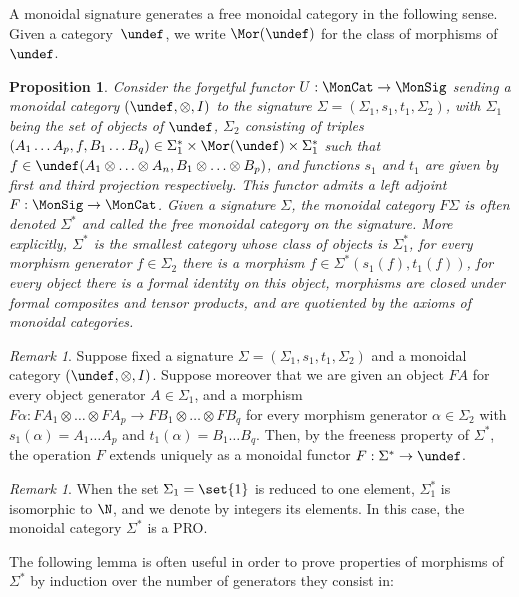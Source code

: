\documentclass[submission,copyright,creativecommons]{eptcs}
\let\C\undef
\newtheorem{proposition}[theorem]{Proposition}
\theoremstyle{definition}
\theoremstyle{remark}
\newtheorem{remark}[theorem]{Remark}
\begin{document}
A monoidal signature generates a free monoidal category in the following
sense. Given a category~$\C$, we write $\Mor(\C)$ for the class of morphisms
of~$\C$.

\begin{proposition}
  Consider the forgetful functor $U:\MonCat\to\MonSig$ sending a monoidal
  category $(\C,\otimes,I)$ to the signature
  $\Sigma=(\Sigma_1,s_1,t_1,\Sigma_2)$, with $\Sigma_1$ being the set of objects
  of $\C$, $\Sigma_2$ consisting of triples $(A_1\ldots A_p,f,B_1\ldots
  B_q)\in\Sigma_1^*\times\Mor(\C)\times\Sigma_1^*$ such that
  $f\in\C(A_1\otimes\ldots\otimes A_n,B_1\otimes\ldots\otimes B_p)$, and
  functions $s_1$ and $t_1$ are given by first and third projection
  respectively. This functor admits a left adjoint $F:\MonSig\to\MonCat$. Given
  a signature $\Sigma$, the monoidal category $F\Sigma$ is often denoted
  $\Sigma^*$ and called the \emph{free monoidal category} on the signature.
More explicitly, $\Sigma^*$ is the smallest category whose class of objects is
  $\Sigma_1^*$, for every morphism generator $f\in\Sigma_2$ there is a morphism
  $f\in\Sigma^*(s_1(f),t_1(f))$, for every object there is a formal identity on
  this object, morphisms are closed under formal composites and tensor products,
  and are quotiented by the axioms of monoidal categories.
\end{proposition}

\begin{remark}
  \label{rem:free-moncat}
  Suppose fixed a signature $\Sigma=(\Sigma_1,s_1,t_1,\Sigma_2)$ and a monoidal
  category $(\C,\otimes,I)$. Suppose moreover that we are given an object $FA$
  for every object generator $A\in\Sigma_1$, and a morphism
  $F\alpha:FA_1\otimes\ldots\otimes FA_p\to FB_1\otimes\ldots\otimes FB_q$ for
  every morphism generator $\alpha\in\Sigma_2$ with $s_1(\alpha)=A_1\ldots A_p$
  and $t_1(\alpha)=B_1\ldots B_q$. Then, by the freeness property of $\Sigma^*$,
  the operation $F$ extends uniquely as a monoidal functor $F:\Sigma^*\to\C$.
\end{remark}



\begin{remark}
  \label{rem:1-object}
  When the set $\Sigma_1=\set{1}$ is reduced to one element, $\Sigma_1^*$ is
  isomorphic to $\N$, and we denote by integers its elements. In this case, the
  monoidal category $\Sigma^*$ is a PRO.
\end{remark}

\noindent
The following lemma is often useful in order to prove properties of morphisms of
$\Sigma^*$ by induction over the number of generators they consist in:
\end{document}
